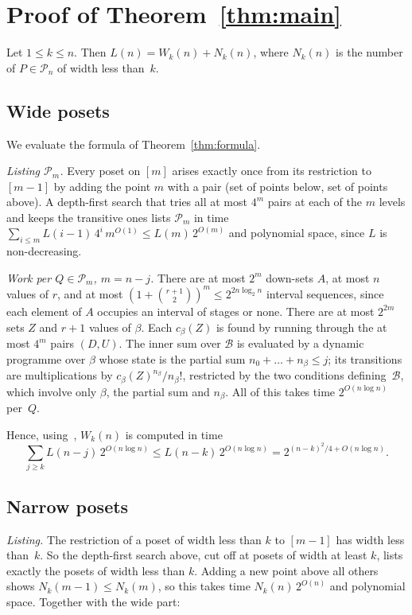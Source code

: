 \documentclass[11pt]{article}
\theoremstyle{definition}
\theoremstyle{remark}
\newcommand{\cP}{\mathcal{P}}
\newcommand{\cB}{\mathcal{B}}
\begin{document}
\section{Proof of Theorem~\ref{thm:main}}

Let $1\le k\le n$. Then $L(n)=W_k(n)+N_k(n)$, where $N_k(n)$ is the number of
$P\in\cP_n$ of width less than~$k$.

\subsection*{Wide posets}
We evaluate the formula of Theorem~\ref{thm:formula}.

\emph{Listing $\cP_m$.} Every poset on $[m]$ arises exactly once from its restriction to
$[m-1]$ by adding the point $m$ with a pair (set of points below, set of points above).
A depth-first search that tries all at most $4^{m}$ pairs at each of the $m$ levels and
keeps the transitive ones lists $\cP_m$ in time
$\sum_{i\le m}L(i-1)\,4^{i}\,m^{O(1)}\le L(m)\,2^{O(m)}$ and polynomial space, since $L$ is
non-decreasing.

\emph{Work per $Q\in\cP_m$, $m=n-j$.} There are at most $2^m$ down-sets $A$, at most $n$
values of $r$, and at most $(1+\binom{r+1}{2})^{m}\le 2^{2n\log_2 n}$ interval sequences,
since each element of $A$ occupies an interval of stages or none. There are at most
$2^{2m}$ sets $Z$ and $r+1$ values of $\beta$. Each $c_\beta(Z)$ is found by running
through the at most $4^m$ pairs $(D,U)$. The inner sum over $\cB$ is evaluated by a
dynamic programme over $\beta$ whose state is the partial sum $n_0+\dots+n_\beta\le j$;
its transitions are multiplications by $c_\beta(Z)^{n_\beta}/n_\beta!$, restricted by the
two conditions defining~$\cB$, which involve only $\beta$, the partial sum and $n_\beta$.
All of this takes time $2^{O(n\log n)}$ per~$Q$.

Hence, using~\cite{KR75}, $W_k(n)$ is computed in time
\[
\sum_{j\ge k}L(n-j)\,2^{O(n\log n)}\le L(n-k)\,2^{O(n\log n)}
=2^{(n-k)^2/4+O(n\log n)} .
\]

\subsection*{Narrow posets}
\emph{Listing.} The restriction of a poset of width less than $k$ to $[m-1]$ has width
less than~$k$. So the depth-first search above, cut off at posets of width at least $k$,
lists exactly the posets of width less than $k$. Adding a new point above all others shows
$N_k(m-1)\le N_k(m)$, so this takes time $N_k(n)\,2^{O(n)}$ and polynomial space.
Together with the wide part:
\end{document}
